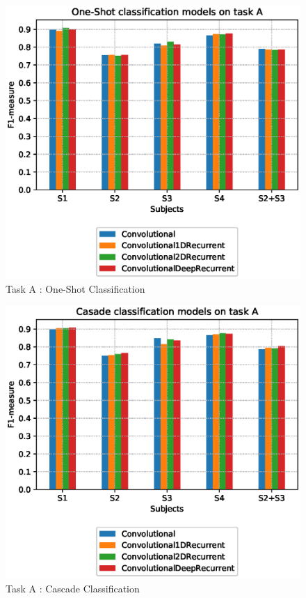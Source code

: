 \begin{figure}[t]
	\centering
	\includegraphics[scale=.4]{figure/A_models_nullclass}
	\caption{Task A : One-Shot Classification}
	\label{fig:A_os}
\end{figure}
\begin{figure}[t]
	\centering
	\includegraphics[scale=.4]{figure/A_models_cascade}
	\caption{Task A : Cascade Classification}
	\label{fig:A_casc}
\end{figure}

